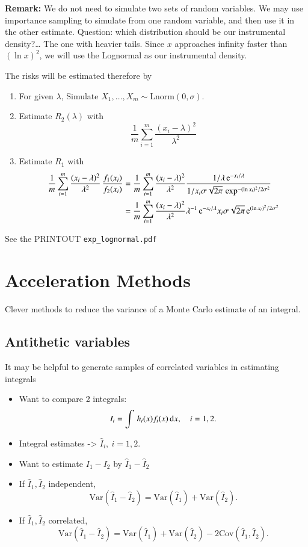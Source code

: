 \documentclass[captions=tableheading]{scrbook}
\begin{document}
\textbf{Remark:}  We do not need to simulate two sets of random variables. We may use importance sampling to simulate from one random variable, and then use it in the other estimate. Question: which distribution should be our instrumental density?\ldots{} The one with heavier tails. Since $x$ approaches infinity faster than $(\ln x)^{2}$, we will use the Lognormal as our instrumental density.

The risks will be estimated therefore by

\begin{enumerate}
\item For given $\lambda$, Simulate $X_{1},\ldots,X_{m} \sim \mathrm{Lnorm}(0,\sigma)$.
\item Estimate $R_{2}(\lambda)$ with 
   \[
   \frac{1}{m}\sum_{i=1}^{m}\frac{(x_{i}-\lambda)^{2}}{\lambda^{2}}
   \]
\item Estimate $R_{1}$ with 
   \begin{align*}
   \frac{1}{m}\sum_{i=1}^{m}\frac{(x_{i}-\lambda)^{2}}{\lambda^{2}}\,\frac{f_{1}(x_{i})}{f_{2}(x_{i})} & =\frac{1}{m}\sum_{i=1}^{m}\frac{(x_{i}-\lambda)^{2}}{\lambda^{2}}\frac{1/\lambda\, \mathrm{e}^{-x_{i}/\lambda}}{1/x_{i}\sigma\sqrt{2\pi}\,\exp^{-(\ln x_{i})^{2}/2\sigma^{2}}}\\
 & =\frac{1}{m}\sum_{i=1}^{m}\frac{(x_{i}-\lambda)^{2}}{\lambda^{2}}\lambda^{-1}\, \mathrm{e}^{-x_{i}/\lambda}x_{i}\sigma\sqrt{2\pi}\, \mathrm{e}^{(\ln x_{i})^{2}/2\sigma^{2}}
   \end{align*}
\end{enumerate}

See the PRINTOUT \texttt{exp\_lognormal.pdf}
\section{Acceleration Methods}
\label{sec-3_5}


Clever methods to reduce the variance of a Monte Carlo estimate of an integral.
\subsection{Antithetic variables}
\label{sec-3_5_1}


It may be helpful to generate samples of correlated variables in estimating integrals


\begin{itemize}
\item Want to compare 2 integrals:
  \[
  I_{i} = \int \, h_{i}(x)f_{i}(x)\, \mathrm{d} x, \quad i = 1,2.
  \]
\item Integral estimates -> \(\hat{I}_{i},\ i=1,2.\)
\item Want to estimate \(I_{1} - I_{2}\) by  \(\hat{I}_{1} - \hat{I}_{2}\)
\item If \(\hat{I}_{1},\hat{I}_{2}\) independent,
  \[
  \mathrm{Var}(\hat{I}_{1} - \hat{I}_{2}) = \mathrm{Var}(\hat{I}_{1}) + \mathrm{Var}(\hat{I}_{2}).
  \]
\item If \(\hat{I}_{1},\hat{I}_{2}\) correlated,
  \[
  \mathrm{Var}(\hat{I}_{1} - \hat{I}_{2}) = \mathrm{Var}(\hat{I}_{1}) + \mathrm{Var}(\hat{I}_{2}) - 2\mathrm{Cov}(\hat{I}_{1},\hat{I}_{2}).
  \]
\end{itemize}
\end{document}
